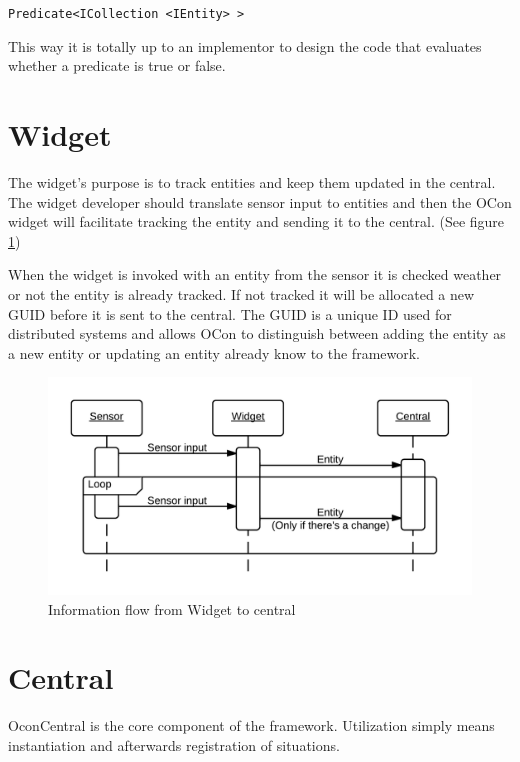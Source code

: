 \documentclass[../report.tex]{subfiles}
\begin{document}
\begin{center}
\texttt{Predicate<ICollection <IEntity> >}
\end{center}


This way it is totally up to an implementor to design the code that evaluates whether a predicate is true or false.


\section{Widget}
\label{sec:OconWidget}

The widget's purpose is to track entities and keep them updated in the central. The widget developer should translate sensor input to entities and then the OCon widget will facilitate tracking the entity and sending it to the central. (See figure \ref{seqwidget})

When the widget is invoked with an entity from the sensor it is checked weather or not the entity is already tracked. If not tracked it will be allocated a new GUID before it is sent to the central. The GUID is a unique ID used for distributed systems and allows OCon to distinguish between adding the entity as a new entity or updating an entity already know to the framework.

\begin{figure}[h]
\centering
\includegraphics[width=\linewidth]{sequencediagram-widget.png}
\caption{Information flow from Widget to central}
\label{seqwidget}
\end{figure}


\section{Central}
OconCentral is the core component of the framework. Utilization simply means instantiation and afterwards registration of situations.
\end{document}
